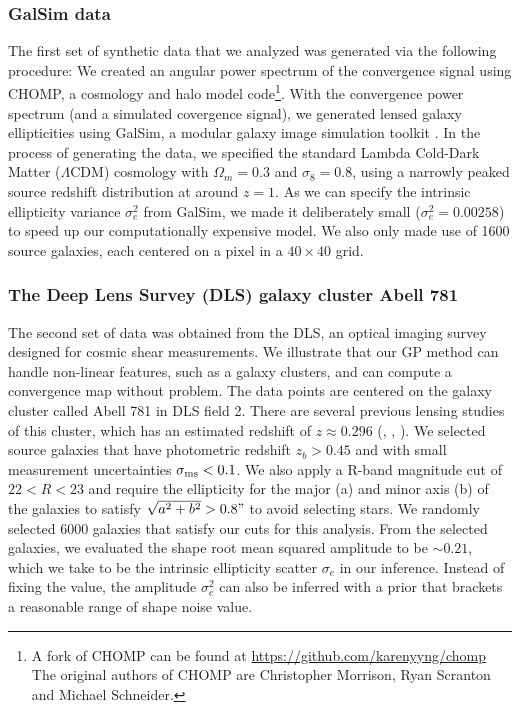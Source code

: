 \subsubsection{{\sc GalSim} data}
The first set of synthetic data that we analyzed was generated via the following procedure: 
We created an angular power spectrum of the convergence signal using {\sc
CHOMP}, a cosmology and halo model code\footnote{A fork of {\sc CHOMP} can be
found at \href{https://github.com/karenyyng/chomp}{https://github.com/karenyyng/chomp}
The original authors of CHOMP are Christopher Morrison, Ryan Scranton and Michael Schneider.
}. 
With the convergence power spectrum (and a simulated covergence signal), 
we generated lensed galaxy ellipticities using {\sc GalSim}, a modular galaxy image
simulation toolkit \citep{Rowe2015}.
In the process of generating the data, we specified 
the standard Lambda Cold-Dark Matter ($\Lambda$CDM) cosmology with $\Omega_m =
0.3$ and $\sigma_8 = 0.8$, using a narrowly peaked source redshift distribution
at around $z = 1$. As we can specify the intrinsic ellipticity variance
$\sigma_e^2$ from {\sc GalSim}, we made it deliberately small ($\sigma_e^2 =
0.00258$) to speed up our computationally expensive model. 
We also only made use of 1600 source galaxies, each centered on a pixel in a 
$40 \times 40$ grid. 
 
\subsubsection{The Deep Lens Survey (DLS) galaxy cluster Abell 781}
The second set of data was obtained from the DLS, an optical imaging survey 
designed for cosmic shear measurements.  
We illustrate that
our GP method can handle non-linear features, such as a galaxy clusters, and 
can compute a convergence map without problem. 
The data points
are centered on the galaxy cluster called Abell 781 in DLS field 2.
There are several previous lensing studies of this cluster, which has an estimated redshift
of $z \approx 0.296$ (\citealt{Wittman2014}, \citealt{Cook2012}, \citealt{Sehgal2008}). 
We selected source galaxies that have photometric redshift $z_b >
0.45$ and with small measurement uncertainties $\sigma_{\rm ms} < 0.1$. We also apply  
a R-band magnitude cut of $22 < R < 23$ and require the ellipticity for the
major (a) and minor axis (b) of the galaxies to satisfy $\sqrt{a^2 + b^2} > 0.8"$ 
to avoid selecting stars. We randomly selected 6000 galaxies that satisfy our
cuts for this analysis. From the selected galaxies, we evaluated the shape
root mean squared amplitude to be $\sim 0.21$, which we take to be the
intrinsic ellipticity scatter $\sigma_e$ in our inference.
Instead of fixing the value, the amplitude
$\sigma_e^2$ can also be inferred with a prior that brackets a reasonable range of
shape noise value.  
 
